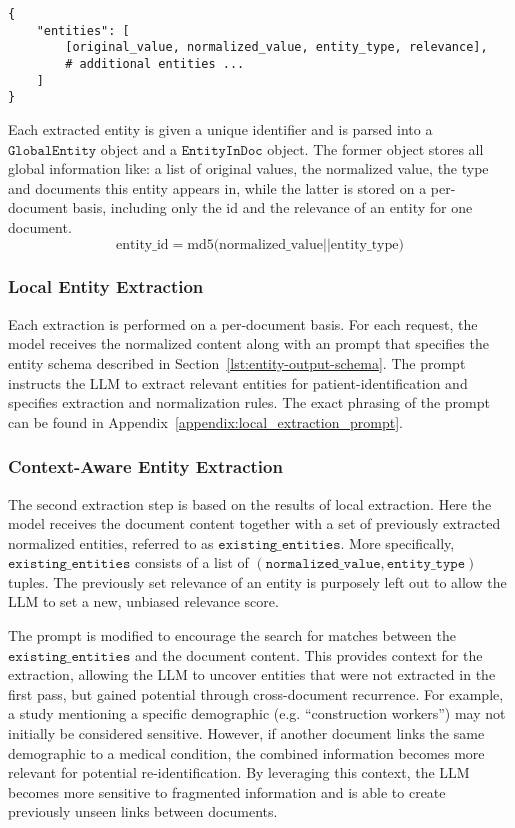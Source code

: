 \begin{lstlisting}[caption={Response JSON schema},label={lst:entity-output-schema}]
{
    "entities": [
        [original_value, normalized_value, entity_type, relevance],
        # additional entities ...
    ]
}
\end{lstlisting}

Each extracted entity is given a unique identifier and is parsed into a $\texttt{GlobalEntity}$ object and a $\texttt{EntityInDoc}$ object. The former object stores all global information like: a list of original values, the normalized value, the type and documents this entity appears in, while the latter is stored on a per-document basis, including only the id and the relevance of an entity for one document.
\[\mbox{entity\_id} = \mbox{md5(normalized\_value} \vert\vert \mbox{entity\_type)}\]



\subsubsection{Local Entity Extraction}
Each extraction is performed on a per-document basis. For each request, the model receives the normalized content along with an prompt that specifies the entity schema described in Section~\ref{lst:entity-output-schema}. The prompt instructs the LLM to extract relevant entities for patient-identification and specifies extraction and normalization rules. The exact phrasing of the prompt can be found in Appendix~\ref{appendix:local_extraction_prompt}.


\subsubsection{Context-Aware Entity Extraction}
The second extraction step is based on the results of local extraction. Here the model receives the document content together with a set of previously extracted normalized entities, referred to as $\texttt{existing\_entities}$. More specifically, $\texttt{existing\_entities}$ consists of a list of $(\texttt{normalized\_value}, \texttt{entity\_type})$ tuples. The previously set relevance of an entity is purposely left out to allow the LLM to set a new, unbiased relevance score.

The prompt is modified to encourage the search for matches between the $\texttt{existing\_entities}$ and the document content. This provides context for the extraction, allowing the LLM to uncover entities that were not extracted in the first pass, but gained potential through cross-document recurrence. For example, a study mentioning a specific demographic (e.g. ``construction workers'') may not initially be considered sensitive. However, if another document links the same demographic to a medical condition, the combined information becomes more relevant for potential re-identification. By leveraging this context, the LLM becomes more sensitive to fragmented information and is able to create previously unseen links between documents. %

